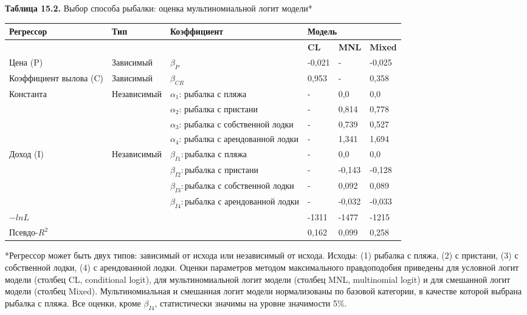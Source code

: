 \textbf{Таблица 15.2. }Выбор способа рыбалки: оценка мультиномиальной логит модели*

\begin{tabular}{|p{0.7in}|p{0.7in}|p{1.7in}|p{0.5in}|p{0.5in}|p{0.5in}|} \hline 
\textbf{Регрессор} & \textbf{Тип} & \textbf{Коэффициент} & \multicolumn{3}{|p{1.4in}|}{\textbf{Модель}} \\ \hline 
\textbf{} & \textbf{} & \textbf{} & \textbf{CL} & \textbf{MNL} & \textbf{Mixed} \\ \hline 
Цена (P) & Зависимый & ${\beta }_P$ & -0,021 & - & -0,025 \\ \hline 
Коэффициент вылова (C) & Зависимый & ${\beta }_{CR}$ & 0,953 & - & 0,358 \\ \hline 
Константа  & Независимый & ${\alpha }_1$: рыбалка с пляжа & - & 0,0 & 0,0 \\ \hline 
 &  & ${\alpha }_2$: рыбалка с пристани & - & 0,814 & 0,778 \\ \hline 
 &  & ${\alpha }_3$: рыбалка с собственной лодки & - & 0,739 & 0,527 \\ \hline 
 &  & ${\alpha }_4$: рыбалка с арендованной лодки & - & 1,341 & 1,694 \\ \hline 
Доход (I) & Независимый & ${\beta }_{I1}:$рыбалка с пляжа & - & 0,0 & 0,0 \\ \hline 
 &  & ${\beta }_{I2}:$рыбалка с пристани & - & -0,143 & -0,128 \\ \hline 
 &  & ${\beta }_{I3}:$рыбалка с собственной лодки & - & 0,092 & 0,089 \\ \hline 
 &  & ${\beta }_{I4}:$рыбалка с арендованной лодки & - & -0,032 & -0,033 \\ \hline 
$-lnL$ &  &  & -1311 & -1477 & -1215 \\ \hline 
Псевдо-$R^2$ &  &  & 0,162 & 0,099 & 0,258 \\ \hline 
\end{tabular}

*Регрессор может быть двух типов: зависимый от исхода или независимый от исхода. Исходы: (1) рыбалка с пляжа, (2) с пристани, (3) с собственной лодки, (4) с арендованной лодки. Оценки параметров методом максимального правдоподобия приведены для условной логит модели (столбец CL, conditional logit), для мультиномиальной логит модели (столбец MNL, multinomial logit) и для смешанной логит модели (столбец Mixed). Мультиномиальная и смешанная логит модели нормализованы по базовой категории, в качестве которой выбрана рыбалка с пляжа. Все оценки, кроме ${\beta }_{I4}$, статистически значимы на уровне значимости 5\%.

